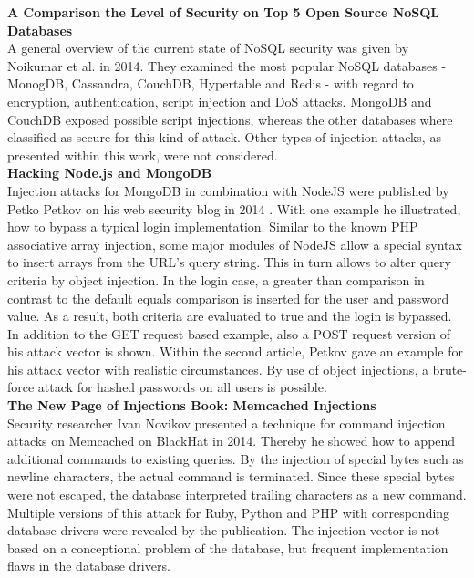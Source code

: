 \textbf{A Comparison the Level of Security on Top 5 Open Source NoSQL Databases} \cite{Noiumkar:2014} \\
A general overview of the current state of NoSQL security was given by Noikumar et al. in 2014. They examined the most popular NoSQL databases - MonogDB, Cassandra, CouchDB, Hypertable and Redis - with regard to encryption, authentication, script injection and DoS attacks. MongoDB and CouchDB exposed possible script injections, whereas the other databases where classified as secure for this kind of attack. Other types of injection attacks, as presented within this work, were not considered. \\

\textbf{Hacking Node.js and MongoDB}\cite{Petkov:2014a, Petkov:2014b} \\
Injection attacks for MongoDB in combination with NodeJS were published by Petko Petkov on his web security blog in 2014 \cite{Petkov:2014a, Petkov:2014b}. With one example he illustrated, how to bypass a typical login implementation. Similar to the known PHP associative array injection, some major modules of NodeJS allow a special syntax to insert arrays from the URL's query string. This in turn allows to alter query criteria by object injection. In the login case, a greater than comparison in contrast to the default equals comparison is inserted for the user and password value. As a result, both criteria are evaluated to true and the login is bypassed. In addition to the GET request based example, also a POST request version of his attack vector is shown. Within the second article, Petkov gave an example for his attack vector with realistic circumstances. By use of object injections, a brute-force attack for hashed passwords on all users is possible.\\

\textbf{The New Page of Injections Book: Memcached Injections} \cite{Novikov:2014} \\
Security researcher Ivan Novikov presented a technique for command injection attacks on Memcached on BlackHat in 2014. Thereby he showed how to append additional commands to existing queries. By the injection of special bytes such as newline characters, the actual command is terminated. Since these special bytes were not escaped, the database interpreted trailing characters as a new command. Multiple versions of this attack for Ruby, Python and PHP with corresponding database drivers were revealed by the publication. The injection vector is not based on a conceptional problem of the database, but frequent implementation flaws in the database drivers. \\

